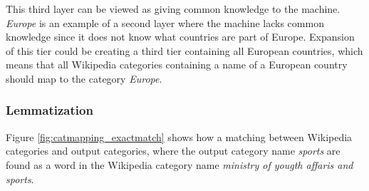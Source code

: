 
This third layer can be viewed as giving common knowledge to the machine. \emph{Europe} is an example of a second layer where the machine lacks common knowledge since it does not know what countries are part of Europe. Expansion of this tier could be creating a third tier containing all European countries, which means that all Wikipedia categories containing a name of a European country should map to the category \emph{Europe}.





\subsubsection{Lemmatization}

Figure \ref{fig:catmapping_exactmatch} shows how a matching between Wikipedia categories and output categories, where the output category name \emph{sports} are found as a word in the Wikipedia category name \emph{ministry of yougth affaris and sports}.

